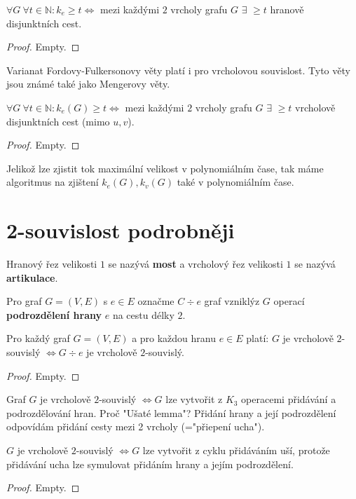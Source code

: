 \begin{veta}
	$\forall G \ \forall t \in \mathbb{N}: k_{e} \geq t \Leftrightarrow$ mezi každými $2$ vrcholy grafu $G$ $\exists$ $\geq t$ hranově disjunktních cest.
\end{veta}

\begin{proof}
	Empty.
\end{proof}

Varianat Fordovy-Fulkersonovy věty platí i pro vrcholovou souvislost. Tyto věty jsou známé také jako Mengerovy věty.

\begin{veta}
	$\forall G \ \forall t \in \mathbb{N}: k_{e}(G) \geq t \Leftrightarrow$ mezi každými $2$ vrcholy grafu $G$ $\exists$ $\geq t$ vrcholově disjunktních cest (mimo $u,v$).
\end{veta}

\begin{proof}
	Empty.
\end{proof}

Jelikož lze zjistit tok maximální velikost v polynomiálním čase, tak máme algoritmus na zjištení $k_{e}(G), k_{v}(G)$ také v polynomiálním čase.

\section{2-souvislost podrobněji}

\begin{definice}
	Hranový řez velikosti $1$ se nazývá \textbf{most} a vrcholový řez velikosti  $1$ se nazývá \textbf{artikulace}.
\end{definice}

Pro graf $G=(V,E)$ s $e \in E$ označme $C \div e$ graf vzniklýz $G$ operací \textbf{podrozdělení hrany} $e$ na cestu délky $2$.

\begin{lemma}
	Pro každý graf $G=(V,E)$ a pro každou hranu $e \in E$ platí: $G$ je vrcholově $2$-souvislý $\Leftrightarrow G \div e$ je vrcholově $2$-souvislý.
\end{lemma}

\begin{proof}
	Empty.
\end{proof}

\begin{veta}
	Graf $G$ je vrcholově $2$-souvislý $\Leftrightarrow G$ lze vytvořit z $K_{3}$ operacemi přidávání a podrozdělování hran. Proč "Ušaté lemma"? Přidání hrany a její podrozdělení odpovídám přidání cesty mezi 2 vrcholy (="přiepení ucha").
\end{veta}

\begin{veta}
	$G$ je vrcholově $2$-souvislý $\Leftrightarrow G$ lze vytvořit z cyklu přidáváním uší, protože přidávání ucha lze symulovat přidáním hrany a jejím podrozdělení.
\end{veta}

\begin{proof}
	Empty.
\end{proof}
